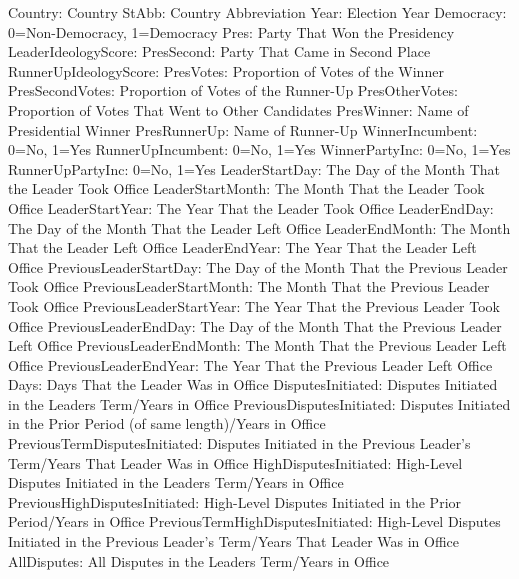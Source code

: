 Country: Country
StAbb: Country Abbreviation 
Year: Election Year
Democracy: 0=Non-Democracy, 1=Democracy
Pres: Party That Won the Presidency
LeaderIdeologyScore:                 
PresSecond: Party That Came in Second Place                        
RunnerUpIdeologyScore:               
PresVotes: Proportion of Votes of the Winner                         
PresSecondVotes: Proportion of Votes of the Runner-Up                   
PresOtherVotes: Proportion of Votes That Went to Other Candidates                                       
PresWinner: Name of Presidential Winner	
PresRunnerUp: Name of Runner-Up                                              
WinnerIncumbent: 0=No, 1=Yes                    
RunnerUpIncumbent: 0=No, 1=Yes                 
WinnerPartyInc: 0=No, 1=Yes                     
RunnerUpPartyInc: 0=No, 1=Yes                  
LeaderStartDay: The Day of the Month That the Leader Took Office                     
LeaderStartMonth: The Month That the Leader Took Office                    
LeaderStartYear: The Year That the Leader Took Office                      
LeaderEndDay: The Day of the Month That the Leader Left Office                        
LeaderEndMonth: The Month That the Leader Left Office                      
LeaderEndYear: The Year That the Leader Left Office                       
PreviousLeaderStartDay: The Day of the Month That the Previous Leader Took Office            
PreviousLeaderStartMonth: The Month That the Previous Leader Took Office            
PreviousLeaderStartYear: The Year That the Previous Leader Took Office             
PreviousLeaderEndDay: The Day of the Month That the Previous Leader Left Office                
PreviousLeaderEndMonth: The Month That the Previous Leader Left Office            
PreviousLeaderEndYear: The Year That the Previous Leader Left Office               
Days: Days That the Leader Was in Office                               
DisputesInitiated: Disputes Initiated in the Leaders Term/Years in Office                      
PreviousDisputesInitiated: Disputes Initiated in the Prior Period (of same length)/Years in Office         
PreviousTermDisputesInitiated: Disputes Initiated in the Previous Leader's Term/Years That Leader Was in Office      
HighDisputesInitiated: High-Level Disputes Initiated in the Leaders Term/Years in Office               
PreviousHighDisputesInitiated: High-Level Disputes Initiated in the Prior Period/Years in Office        
PreviousTermHighDisputesInitiated: High-Level Disputes Initiated in the Previous Leader's Term/Years That Leader Was in Office       
AllDisputes: All Disputes in the Leaders Term/Years in Office                         
